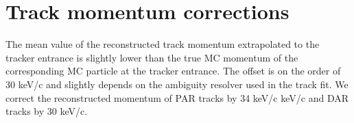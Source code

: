 \section{Track momentum corrections}

The mean value of the reconstructed track momentum extrapolated to the tracker entrance is
slightly lower than the true MC momentum of the corresponding MC particle {\blue at the tracker entrance}.
The offset is  {\blue on} the order of 30 keV/c and slightly  
{\blue depends on the ambiguity resolver used in the track fit.}
We correct the reconstructed  {\blue momentum} of PAR tracks by 34 keV/c 
{\blue keV/c} and DAR tracks \strike{-} by 30 keV/c.

